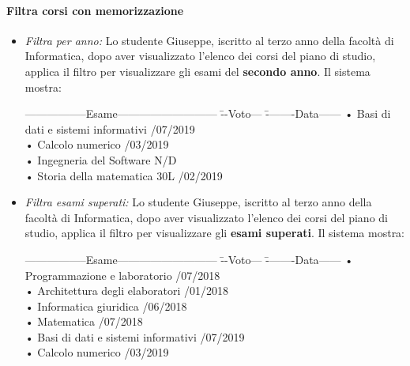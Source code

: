 \paragraph{Filtra corsi con memorizzazione}
\begin{itemize}
	\item \textit{Filtra per anno:} 
	Lo studente Giuseppe, iscritto al terzo anno della facoltà di Informatica, dopo aver visualizzato l’elenco dei corsi del piano di studio, applica il filtro per visualizzare gli esami del \textbf{secondo anno}. Il sistema mostra:
	\begin{tabbing}
		\hspace{1cm}-----------------Esame--------------------------- \= --Voto--- \= --------Data------ \kill
		\hspace{1cm} • Basi di dati e sistemi informativi  /07/2019 \\
		\hspace{1cm} • Calcolo numerico  /03/2019 \\
		\hspace{1cm} • Ingegneria del Software\> N/D \> \\
		\hspace{1cm} • Storia della matematica \> 30L /02/2019 \\
	\end{tabbing}
	
	\item \textit{Filtra esami superati:} 
	Lo studente Giuseppe, iscritto al terzo anno della facoltà di Informatica, dopo aver visualizzato l’elenco dei corsi del piano di studio, applica il filtro per visualizzare gli\textbf{ esami superati}. Il sistema mostra:
	\begin{tabbing}
		\hspace{1cm}-----------------Esame--------------------------- \= --Voto--- \= --------Data------ \kill
		\hspace{1cm} • Programmazione e laboratorio  /07/2018 \\
		\hspace{1cm} • Architettura degli elaboratori  /01/2018 \\
		\hspace{1cm} • Informatica giuridica  /06/2018 \\
		\hspace{1cm} • Matematica  /07/2018 \\
		\hspace{1cm} • Basi di dati e sistemi informativi  /07/2019 \\
		\hspace{1cm} • Calcolo numerico  /03/2019 \\
	\end{tabbing}
	

\end{itemize}
